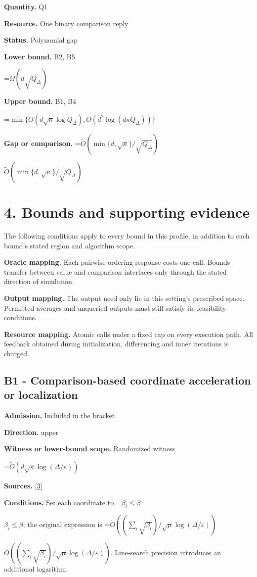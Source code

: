\documentclass[10pt,a4paper]{article}
\newcommand{\AtlasMath}[1]{\par\begingroup\centering\setbox0=\hbox{$\displaystyle #1$}\ifdim\wd0>1.4\linewidth\typeout{ATLAS WIDE FORMULA: \the\wd0}\fi\ifdim\wd0>\linewidth\resizebox{\linewidth}{!}{\box0}\else\box0\fi\par\endgroup}
\newcommand{\AtlasInlineMath}[1]{\begingroup\setbox0=\hbox{$#1$}\ifdim\wd0>.4\linewidth\endgroup\AtlasMath{#1}\else\endgroup$#1$\fi}
\begin{document}
\textbf{Quantity.} Q1

\textbf{Resource.} One binary comparison reply

\textbf{Status.} Polynomial gap

\textbf{Lower bound.} B2, B5

\AtlasMath{\Omega(d\sqrt{Q_\Delta})}
\textbf{Upper bound.} B1, B4

\AtlasMath{\min\{\widetilde{O}(d\sqrt\kappa\log Q_\Delta),O(d^2\log(d\kappa Q_\Delta))\}}
\textbf{Gap or comparison.} \AtlasInlineMath{\widetilde{O}(\min\{d,\sqrt\kappa\}/\sqrt{Q_\Delta})}

\section{4. Bounds and supporting evidence}
The following conditions apply to every bound in this profile, in addition to each bound's stated region and algorithm scope.

\textbf{Oracle mapping.} Each pairwise ordering response costs one call. Bounds transfer between value and comparison interfaces only through the stated direction of simulation.

\textbf{Output mapping.} The output need only lie in this setting's prescribed space. Permitted averages and unqueried outputs must still satisfy its feasibility conditions.

\textbf{Resource mapping.} Atomic calls under a fixed cap on every execution path. All feedback obtained during initialization, differencing and inner iterations is charged.

\subsection{B1 - Comparison-based coordinate acceleration or localization}
\textbf{Admission.} Included in the bracket

\textbf{Direction.} upper

\textbf{Witness or lower-bound scope.} Randomized witness

\AtlasMath{\widetilde{O}\!\left(d\sqrt\kappa\log(\Delta/\varepsilon)\right)}
\textbf{Sources.} \href{https://proceedings.neurips.cc/paper_files/paper/2024/file/26289c647c6828e862e271ca3c490486-Paper-Conference.pdf}{[3]}

\textbf{Conditions.} Set each coordinate to \AtlasInlineMath{\beta _i\le \beta}; the original expression is \AtlasInlineMath{\widetilde{O}((\sum_i\sqrt{\beta _i})/\sqrt\mu\log(\Delta/\varepsilon))}. Line-search precision introduces an additional logarithm.
\end{document}
